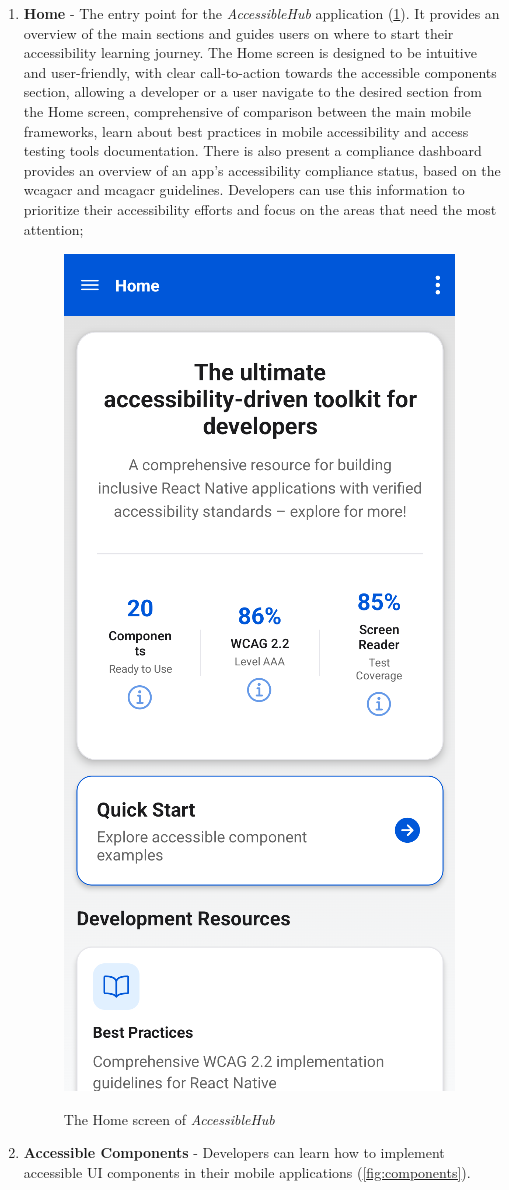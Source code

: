 \begin{enumerate}
    \item \textbf{Home} - The entry point for the \textit{AccessibleHub} application (\ref{fig:homescreen}). It provides an overview of the main sections and guides users on where to start their accessibility learning journey. The Home screen is designed to be intuitive and user-friendly, with clear call-to-action towards the accessible components section, allowing a developer or a user navigate to the desired section from the Home screen, comprehensive of comparison between the main mobile frameworks, learn about best practices in mobile accessibility and access testing tools documentation. There is also present a compliance dashboard provides an overview of an app's accessibility compliance status, based on the \acrshort{wcagacr} and \acrshort{mcagacr} guidelines. Developers can use this information to prioritize their accessibility efforts and focus on the areas that need the most attention;

    \begin{figure}[ht]
    \centering
    \includegraphics[width=0.4\linewidth, alt={Screenshot of the Home screen of AccessibleHub}]{img/homescreen.png}
    \caption{The Home screen of \textit{AccessibleHub}}\label{fig:homescreen}
    \end{figure}

\pagebreak

    \item \textbf{Accessible Components} - Developers can learn how to implement accessible UI components in their mobile applications (\ref{fig:components}). 


\end{enumerate}

